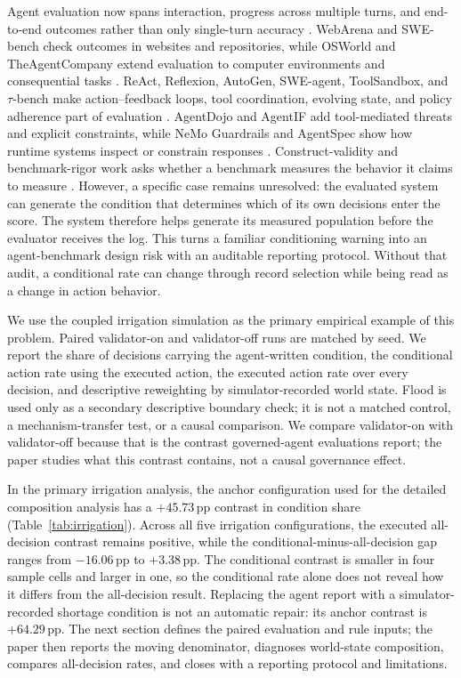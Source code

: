 \documentclass{article}
\newcommand{\pp}{\,\mathrm{pp}}
\begin{document}
Agent evaluation now spans interaction, progress across multiple turns, and end-to-end outcomes rather than only single-turn accuracy \citep{kapoor2024agents,liu2023agentbench,ma2024agentboard,osworld2024,agentcompany2025}. WebArena and SWE-bench check outcomes in websites and repositories, while OSWorld and TheAgentCompany extend evaluation to computer environments and consequential tasks \citep{zhou2024webarena,jimenez2024swebench,osworld2024,agentcompany2025}. ReAct, Reflexion, AutoGen, SWE-agent, ToolSandbox, and $\tau$-bench make action--feedback loops, tool coordination, evolving state, and policy adherence part of evaluation \citep{yao2023react,shinn2023reflexion,wu2023autogen,yang2024sweagent,toolsandbox2025,yao2025taubench}. AgentDojo and AgentIF add tool-mediated threats and explicit constraints, while NeMo Guardrails and AgentSpec show how runtime systems inspect or constrain responses \citep{agentdojo2024,agentif2025,rebedea2023nemo,wang2026agentspec}. Construct-validity and benchmark-rigor work asks whether a benchmark measures the behavior it claims to measure \citep{bean2025construct,zhu2025abc}. However, a specific case remains unresolved: the evaluated system can generate the condition that determines which of its own decisions enter the score. The system therefore helps generate its measured population before the evaluator receives the log. This turns a familiar conditioning warning into an agent-benchmark design risk with an auditable reporting protocol. Without that audit, a conditional rate can change through record selection while being read as a change in action behavior.

We use the coupled irrigation simulation as the primary empirical example of this problem. Paired validator-on and validator-off runs are matched by seed. We report the share of decisions carrying the agent-written condition, the conditional action rate using the executed action, the executed action rate over every decision, and descriptive reweighting by simulator-recorded world state. Flood is used only as a secondary descriptive boundary check; it is not a matched control, a mechanism-transfer test, or a causal comparison. We compare validator-on with validator-off because that is the contrast governed-agent evaluations report; the paper studies what this contrast contains, not a causal governance effect.

In the primary irrigation analysis, the anchor configuration used for the detailed composition analysis has a $+45.73\pp$ contrast in condition share (Table~\ref{tab:irrigation}). Across all five irrigation configurations, the executed all-decision contrast remains positive, while the conditional-minus-all-decision gap ranges from $-16.06\pp$ to $+3.38\pp$. The conditional contrast is smaller in four sample cells and larger in one, so the conditional rate alone does not reveal how it differs from the all-decision result. Replacing the agent report with a simulator-recorded shortage condition is not an automatic repair: its anchor contrast is $+64.29\pp$. The next section defines the paired evaluation and rule inputs; the paper then reports the moving denominator, diagnoses world-state composition, compares all-decision rates, and closes with a reporting protocol and limitations.
\end{document}
